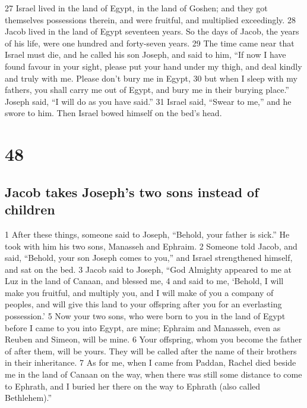 {27} Israel lived in the land of Egypt, in the land of Goshen; and they
got themselves possessions therein, and were fruitful, and multiplied
exceedingly. {28} Jacob lived in the land of Egypt seventeen years. So
the days of Jacob, the years of his life, were one hundred and
forty-seven years. {29} The time came near that Israel must die, and he
called his son Joseph, and said to him, ``If now I have found favour in
your sight, please put your hand under my thigh, and deal kindly and
truly with me. Please don't bury me in Egypt, {30} but when I sleep with
my fathers, you shall carry me out of Egypt, and bury me in their
burying place.'' Joseph said, ``I will do as you have said.'' {31}
Israel said, ``Swear to me,'' and he swore to him. Then Israel bowed
himself on the bed's head.

\hypertarget{section-47}{%
\section{48}\label{section-47}}

\hypertarget{jacob-takes-josephs-two-sons-instead-of-children}{%
\subsection{Jacob takes Joseph's two sons instead of
children}\label{jacob-takes-josephs-two-sons-instead-of-children}}

{1} After these things, someone said to Joseph, ``Behold, your father is
sick.'' He took with him his two sons, Manasseh and Ephraim. {2} Someone
told Jacob, and said, ``Behold, your son Joseph comes to you,'' and
Israel strengthened himself, and sat on the bed. {3} Jacob said to
Joseph, ``God Almighty appeared to me at Luz in the land of Canaan, and
blessed me, {4} and said to me, `Behold, I will make you fruitful, and
multiply you, and I will make of you a company of peoples, and will give
this land to your offspring after you for an everlasting possession.'
{5} Now your two sons, who were born to you in the land of Egypt before
I came to you into Egypt, are mine; Ephraim and Manasseh, even as Reuben
and Simeon, will be mine. {6} Your offspring, whom you become the father
of after them, will be yours. They will be called after the name of
their brothers in their inheritance. {7} As for me, when I came from
Paddan, Rachel died beside me in the land of Canaan on the way, when
there was still some distance to come to Ephrath, and I buried her there
on the way to Ephrath (also called Bethlehem).''

